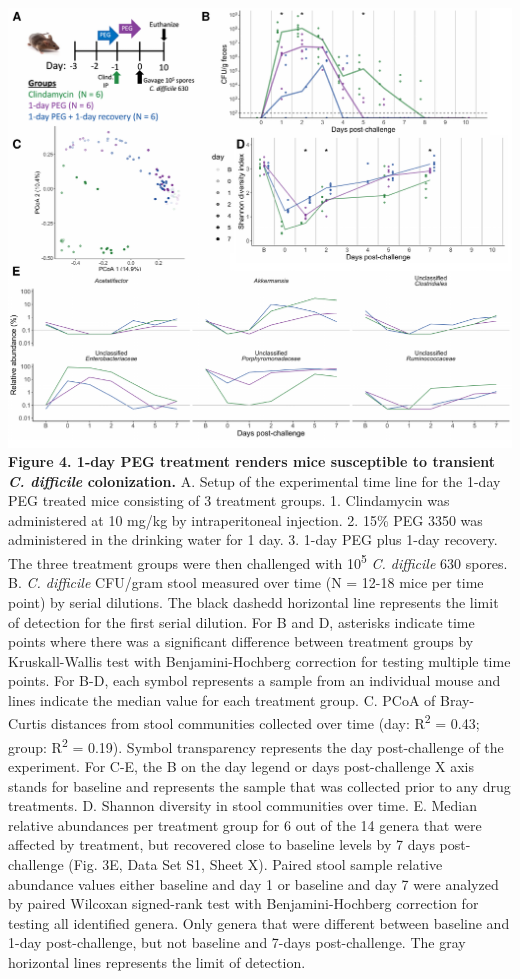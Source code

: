 \documentclass[
  11pt,
]{article}
\begin{document}
\includegraphics{figure_4.pdf} \textbf{Figure 4. 1-day PEG treatment
renders mice susceptible to transient \emph{C. difficile} colonization.}
A. Setup of the experimental time line for the 1-day PEG treated mice
consisting of 3 treatment groups. 1. Clindamycin was administered at 10
mg/kg by intraperitoneal injection. 2. 15\% PEG 3350 was administered in
the drinking water for 1 day. 3. 1-day PEG plus 1-day recovery. The
three treatment groups were then challenged with 10\textsuperscript{5}
\emph{C. difficile} 630 spores. B. \emph{C. difficile} CFU/gram stool
measured over time (N = 12-18 mice per time point) by serial dilutions.
The black dashedd horizontal line represents the limit of detection for
the first serial dilution. For B and D, asterisks indicate time points
where there was a significant difference between treatment groups by
Kruskall-Wallis test with Benjamini-Hochberg correction for testing
multiple time points. For B-D, each symbol represents a sample from an
individual mouse and lines indicate the median value for each treatment
group. C. PCoA of Bray-Curtis distances from stool communities collected
over time (day: R\textsuperscript{2} = 0.43; group: R\textsuperscript{2}
= 0.19). Symbol transparency represents the day post-challenge of the
experiment. For C-E, the B on the day legend or days post-challenge X
axis stands for baseline and represents the sample that was collected
prior to any drug treatments. D. Shannon diversity in stool communities
over time. E. Median relative abundances per treatment group for 6 out
of the 14 genera that were affected by treatment, but recovered close to
baseline levels by 7 days post-challenge (Fig. 3E, Data Set S1, Sheet
X). Paired stool sample relative abundance values either baseline and
day 1 or baseline and day 7 were analyzed by paired Wilcoxan signed-rank
test with Benjamini-Hochberg correction for testing all identified
genera. Only genera that were different between baseline and 1-day
post-challenge, but not baseline and 7-days post-challenge. The gray
horizontal lines represents the limit of detection.
\end{document}
